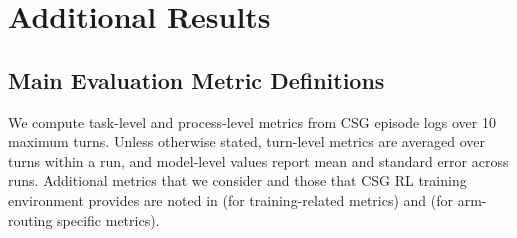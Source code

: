 \documentclass[11pt]{article}
\theoremstyle{plain}
\theoremstyle{definition}
\theoremstyle{remark}
\begin{document}
\section{Additional Results}
\label{app:binary_search_echo}


\subsection{Main Evaluation Metric Definitions}
\label{ssec:main_task_epistemic_metrics_full}
We compute task-level and process-level metrics from CSG episode logs over 10 maximum turns. Unless otherwise stated, turn-level metrics are averaged over turns within a run, and model-level values report mean and standard error across runs. Additional metrics that we consider and those that CSG RL training environment provides are noted in  (for training-related metrics) and  (for arm-routing specific metrics). 
\end{document}
